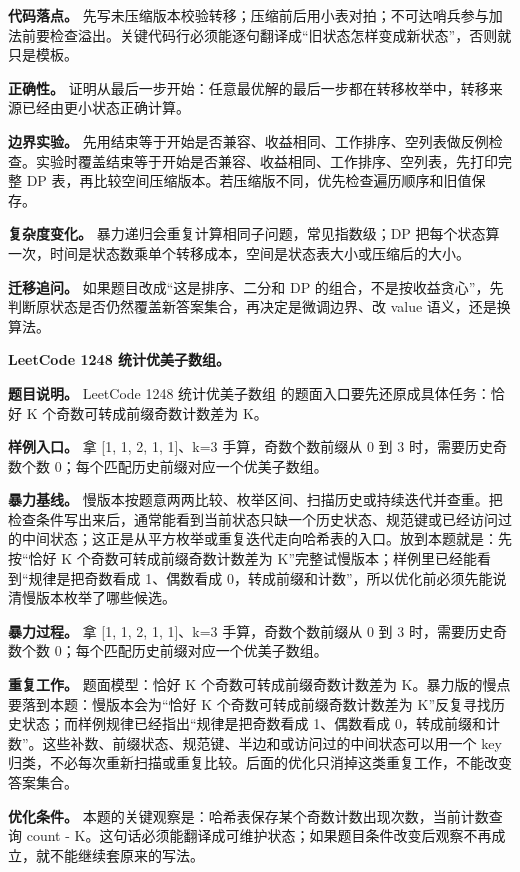 \textbf{代码落点。} 先写未压缩版本校验转移；压缩前后用小表对拍；不可达哨兵参与加法前要检查溢出。关键代码行必须能逐句翻译成“旧状态怎样变成新状态”，否则就只是模板。

\textbf{正确性。} 证明从最后一步开始：任意最优解的最后一步都在转移枚举中，转移来源已经由更小状态正确计算。

\textbf{边界实验。} 先用结束等于开始是否兼容、收益相同、工作排序、空列表做反例检查。实验时覆盖结束等于开始是否兼容、收益相同、工作排序、空列表，先打印完整 DP 表，再比较空间压缩版本。若压缩版不同，优先检查遍历顺序和旧值保存。

\textbf{复杂度变化。} 暴力递归会重复计算相同子问题，常见指数级；DP 把每个状态算一次，时间是状态数乘单个转移成本，空间是状态表大小或压缩后的大小。

\textbf{迁移追问。} 如果题目改成“这是排序、二分和 DP 的组合，不是按收益贪心”，先判断原状态是否仍然覆盖新答案集合，再决定是微调边界、改 value 语义，还是换算法。

\noindent\textbf{LeetCode 1248 统计优美子数组。}

\textbf{题目说明。} LeetCode 1248 统计优美子数组 的题面入口要先还原成具体任务：恰好 K 个奇数可转成前缀奇数计数差为 K。

\textbf{样例入口。} 拿 [1, 1, 2, 1, 1]、k=3 手算，奇数个数前缀从 0 到 3 时，需要历史奇数个数 0；每个匹配历史前缀对应一个优美子数组。

\textbf{暴力基线。} 慢版本按题意两两比较、枚举区间、扫描历史或持续迭代并查重。把检查条件写出来后，通常能看到当前状态只缺一个历史状态、规范键或已经访问过的中间状态；这正是从平方枚举或重复迭代走向哈希表的入口。放到本题就是：先按“恰好 K 个奇数可转成前缀奇数计数差为 K”完整试慢版本；样例里已经能看到“规律是把奇数看成 1、偶数看成 0，转成前缀和计数”，所以优化前必须先能说清慢版本枚举了哪些候选。

\textbf{暴力过程。} 拿 [1, 1, 2, 1, 1]、k=3 手算，奇数个数前缀从 0 到 3 时，需要历史奇数个数 0；每个匹配历史前缀对应一个优美子数组。

\textbf{重复工作。} 题面模型：恰好 K 个奇数可转成前缀奇数计数差为 K。暴力版的慢点要落到本题：慢版本会为“恰好 K 个奇数可转成前缀奇数计数差为 K”反复寻找历史状态；而样例规律已经指出“规律是把奇数看成 1、偶数看成 0，转成前缀和计数”。这些补数、前缀状态、规范键、半边和或访问过的中间状态可以用一个 key 归类，不必每次重新扫描或重复比较。后面的优化只消掉这类重复工作，不能改变答案集合。

\textbf{优化条件。} 本题的关键观察是：哈希表保存某个奇数计数出现次数，当前计数查询 count - K。这句话必须能翻译成可维护状态；如果题目条件改变后观察不再成立，就不能继续套原来的写法。

